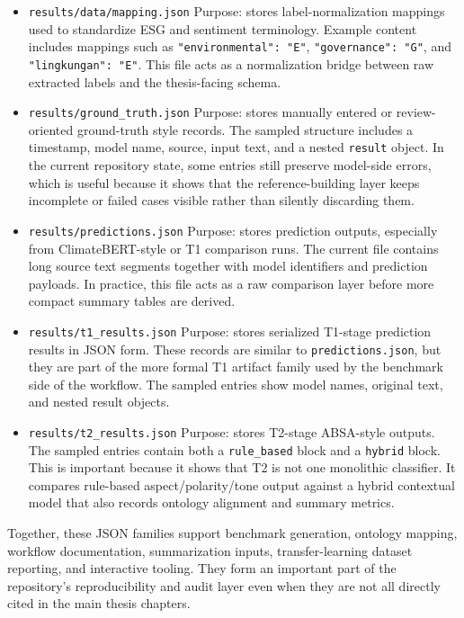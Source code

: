 \documentclass[english, online, cse, master]{dithesis}
\begin{document}
\begin{itemize}
\item
  \texttt{results/data/mapping.json} Purpose: stores label-normalization mappings used to standardize ESG and sentiment terminology. Example content includes mappings such as \texttt{"environmental":\ "E"}, \texttt{"governance":\ "G"}, and \texttt{"lingkungan":\ "E"}. This file acts as a normalization bridge between raw extracted labels and the thesis-facing schema.

\item
  \texttt{results/ground\_truth.json} Purpose: stores manually entered or review-oriented ground-truth style records. The sampled structure includes a timestamp, model name, source, input text, and a nested \texttt{result} object. In the current repository state, some entries still preserve model-side errors, which is useful because it shows that the reference-building layer keeps incomplete or failed cases visible rather than silently discarding them.
\item
  \texttt{results/predictions.json} Purpose: stores prediction outputs, especially from ClimateBERT-style or T1 comparison runs. The current file contains long source text segments together with model identifiers and prediction payloads. In practice, this file acts as a raw comparison layer before more compact summary tables are derived.

\item
  \texttt{results/t1\_results.json} Purpose: stores serialized T1-stage prediction results in JSON form. These records are similar to \texttt{predictions.json}, but they are part of the more formal T1 artifact family used by the benchmark side of the workflow. The sampled entries show model names, original text, and nested result objects.

\item
  \texttt{results/t2\_results.json} Purpose: stores T2-stage ABSA-style outputs. The sampled entries contain both a \texttt{rule\_based} block and a \texttt{hybrid} block. This is important because it shows that T2 is not one monolithic classifier. It compares rule-based aspect/polarity/tone output against a hybrid contextual model that also records ontology alignment and summary metrics.
\end{itemize}

Together, these JSON families support benchmark generation, ontology mapping, workflow documentation, summarization inputs, transfer-learning dataset reporting, and interactive tooling. They form an important part of the repository's reproducibility and audit layer even when they are not all directly cited in the main thesis chapters.
 
\end{document}
